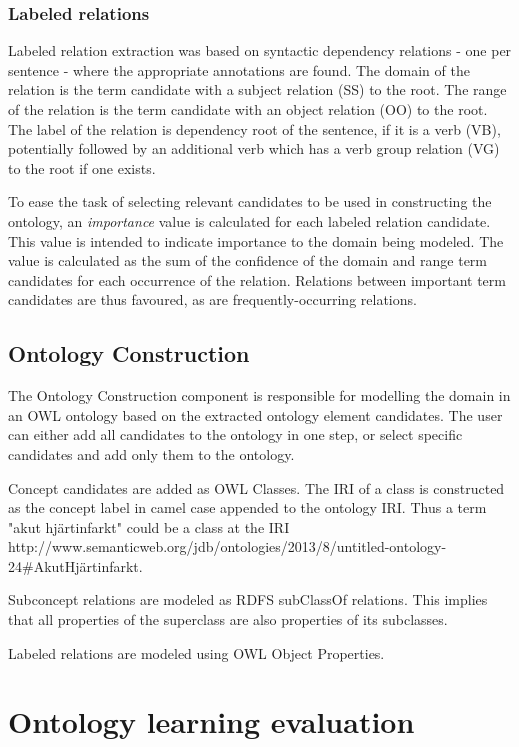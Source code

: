 \documentclass[a4paper]{report}
\begin{document}
\subsubsection{Labeled relations}
\label{sec:results:proto:cands}

Labeled relation extraction was based on syntactic dependency relations - one per sentence - where the appropriate annotations are found.
The domain of the relation is the term candidate with a subject relation (SS) to the root.
The range of the relation is the term candidate with an object relation (OO) to the root.
The label of the relation is dependency root of the sentence, if it is a verb (VB), potentially followed by an additional verb which has a verb group relation (VG) to the root if one exists.

To ease the task of selecting relevant candidates to be used in constructing the ontology, an \emph{importance} value is calculated for each labeled relation candidate.
This value is intended to indicate importance to the domain being modeled.
The value is calculated as the sum of the confidence of the domain and range term candidates for each occurrence of the relation.
Relations between important term candidates are thus favoured, as are frequently-occurring relations.

\subsection{Ontology Construction}

The Ontology Construction component is responsible for modelling the domain in an OWL ontology based on the extracted ontology element candidates.
The user can either add all candidates to the ontology in one step, or select specific candidates and add only them to the ontology.

Concept candidates are added as OWL Classes.
The IRI of a class is constructed as the concept label in camel case appended to the ontology IRI.
Thus a term "akut hjärtinfarkt" could be a class at the IRI http://www.semanticweb.org/jdb/ontologies/2013/8/untitled-ontology-24#AkutHjärtinfarkt.

Subconcept relations are modeled as RDFS subClassOf relations.
This implies that all properties of the superclass are also properties of its subclasses.

Labeled relations are modeled using OWL Object Properties.


\section{Ontology learning evaluation}
\label{sec:results:eval}
\end{document}
